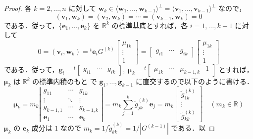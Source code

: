 \documentclass[11pt, uplatex, dvipdfmx]{jsarticle}
\theoremstyle{definition}
\begin{document}
\begin{proof}
  各 $k=2,\ldots, n$ に対して
  $\bm{w}_k \in \langle \bm{w}_1, \ldots, \bm{w}_{k-1}\rangle^{\perp} =
  \langle\bm{v}_1, \ldots, \bm{v}_{k-1}\rangle^{\perp} $ なので，
  \[
    (\bm{v}_1, \bm{w}_k) = (\bm{v}_2, \bm{w}_k) = \cdots = (\bm{v}_{k-1}, \bm{w}_k) = 0
  \]
  である．従って，$\{\bm{e}_{1}, \ldots,
  \bm{e}_k\}$ を $\mathbb{R}^k$ の標準基底とすれば，各 $i=1,
  \ldots, k-1$ に対して
  \[
    0  =(\bm{v}_i, \bm{w}_k) = {}^{t}\bm{e}_{i}
    G^{(k)} \left[
      \begin{array}{c}
        \mu_{1k}\\
        \vdots\\
            1
      \end{array}
    \right]
    = \left[
      \begin{array}{ccc}
        g_{i1} & \cdots & g_{ik}
      \end{array}
    \right] \left[
      \begin{array}{c}
        \mu_{1k}\\
        \vdots \\
        1
      \end{array}
    \right] 
  \]
  である．従って，$\bm{g}_i = {}^{t}\left[
    \begin{array}{ccc}
      g_{i1} & \cdots & g_{ik}
    \end{array}
  \right], \; \bm{\mu}_k = {}^{t}\left[
    \begin{array}{cccc}
      \mu_{1k} & \cdots & \mu_{k-1,k} & 1
    \end{array}
  \right]$ とすれば，$\bm{\mu}_k$ は $\mathbb{R}^k$ の標準内積のもと
  で $\bm{g}_1, \ldots, \bm{g}_{k-1}$ に直交するので以下のように書ける．
  \[
    \bm{\mu}_k = m_k \left|
      \begin{array}{ccc}
        g_{11} & \cdots & g_{1k}\\
        \vdots & \ddots & \vdots\\
        g_{k-1,1} & \cdots & g_{k-1,k}\\
        \bm{e}_1 & \cdots & \bm{e}_k
      \end{array}
    \right| = m_k \sum_{j=1}^{k} \tilde{g}^{(k)}_{jk} \bm{e}_j
    = m_k \left[
      \begin{array}{c}
        \tilde{g}^{(k)}_{1k}\\
        \vdots\\
        \tilde{g}^{(k)}_{kk}
      \end{array}
    \right]\quad ( m_k \in \mathbb{R})
  \]
  $\bm{\mu}_k$ の $\bm{e}_k$ 成分は $1$ なので
  $m_k = 1/\tilde{g}^{(k)}_{kk} = 1/\left|G^{(k-1)}\right|$ である．以

\end{proof}
\end{document}
